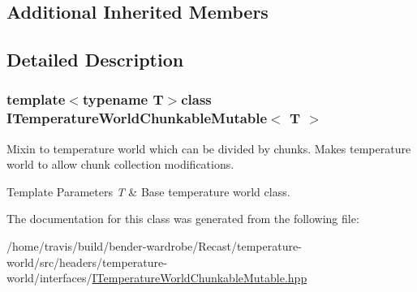 \subsection*{Additional Inherited Members}


\subsection{Detailed Description}
\subsubsection*{template$<$typename T$>$class I\-Temperature\-World\-Chunkable\-Mutable$<$ T $>$}

Mixin to temperature world which can be divided by chunks. Makes temperature world to allow chunk collection modifications.


\begin{DoxyTemplParams}{Template Parameters}
{\em T} & Base temperature world class. \\
\hline
\end{DoxyTemplParams}


The documentation for this class was generated from the following file\-:\begin{DoxyCompactItemize}
\item 
/home/travis/build/bender-\/wardrobe/\-Recast/temperature-\/world/src/headers/temperature-\/world/interfaces/\hyperlink{_i_temperature_world_chunkable_mutable_8hpp}{I\-Temperature\-World\-Chunkable\-Mutable.\-hpp}\end{DoxyCompactItemize}
